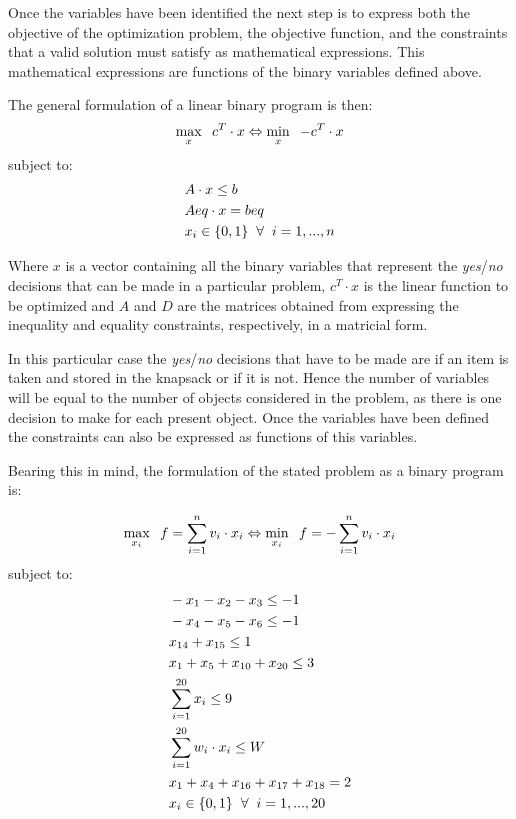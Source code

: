 Once the variables have been identified the next step is to express both the objective of the optimization problem, the objective function, and the constraints that a valid solution must satisfy as mathematical expressions. This mathematical expressions are functions of the binary variables defined above. 

The general formulation of a linear binary program is then:
$$\max_{x}\hspace{2mm} c^T\cdot x \Leftrightarrow \min_{x}\hspace{2mm} -c^T\cdot x$$
\hspace{6cm}subject to:
\begin{equation*}
\begin{split}
&A\cdot x\leq b \\
&Aeq\cdot x = beq \\
&x_i \in\lbrace 0,1 \rbrace\hspace{2mm} \forall \hspace{2mm} i = 1,...,n
\end{split}
\end{equation*}

Where $x$ is a vector containing all the binary variables that represent the \textit{yes}/\textit{no} decisions that can be made in a particular problem, $c^T\cdot x$ is the linear function to be optimized and $A$ and $D$ are the matrices obtained from expressing the inequality and equality constraints, respectively, in a matricial form.

In this particular case the \textit{yes}/\textit{no} decisions that have to be made are if an item is taken and stored in the knapsack or if it is not. Hence the number of variables will be equal to the number of objects considered in the problem, as there is one decision to make for each present object. Once the variables have been defined the constraints can also be expressed as functions of this variables.

Bearing this in mind, the formulation of the stated problem as a binary program is:
 
$$\max_{x_i} \hspace{2mm} f=\sum_{i=1}^{n}v_i\cdot x_i \Leftrightarrow \min_{x_i}\hspace{2mm}f=-\sum_{i=1}^{n}v_i\cdot x_i$$
\hspace{4.7cm}subject to:
\begin{equation*}
\begin{split}
&-x_1-x_2-x_3\leq -1 \\
&-x_4-x_5-x_6\leq -1 \\
&x_{14}+x_{15} \leq 1 \\
&x_1+x_5+x_{10}+x_{20}\leq 3 \\
&\sum_{i=1}^{20}x_i\leq 9  \\
&\sum_{i=1}^{20}w_i\cdot{x_i}\leq W \\
&x_1 + x_4 + x_{16} + x_{17} + x_{18} = 2 \\
&x_i \in\lbrace 0,1 \rbrace\hspace{2mm} \forall \hspace{2mm} i = 1,...,20
\end{split}
\end{equation*}

